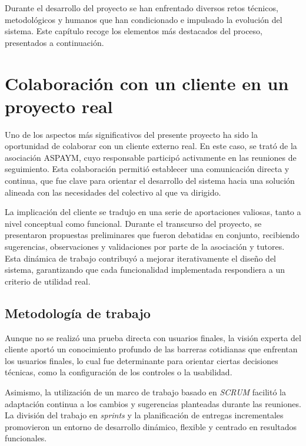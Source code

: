 Durante el desarrollo del proyecto se han enfrentado diversos retos técnicos, metodológicos y humanos que han condicionado e impulsado la evolución del sistema. Este capítulo recoge los elementos más destacados del proceso, presentados a continuación.

\section{Colaboración con un cliente en un proyecto real}

Uno de los aspectos más significativos del presente proyecto ha sido la oportunidad de colaborar con un cliente externo real. En este caso, se trató de la asociación ASPAYM, cuyo responsable participó activamente en las reuniones de seguimiento. Esta colaboración permitió establecer una comunicación directa y continua, que fue clave para orientar el desarrollo del sistema hacia una solución alineada con las necesidades del colectivo al que va dirigido.

La implicación del cliente se tradujo en una serie de aportaciones valiosas, tanto a nivel conceptual como funcional. Durante el transcurso del proyecto, se presentaron propuestas preliminares que fueron debatidas en conjunto, recibiendo sugerencias, observaciones y validaciones por parte de la asociación y tutores. Esta dinámica de trabajo contribuyó a mejorar iterativamente el diseño del sistema, garantizando que cada funcionalidad implementada respondiera a un criterio de utilidad real.

\subsection{Metodología de trabajo}

Aunque no se realizó una prueba directa con usuarios finales, la visión experta del cliente aportó un conocimiento profundo de las barreras cotidianas que enfrentan los usuarios finales, lo cual fue determinante para orientar ciertas decisiones técnicas, como la configuración de los controles o la usabilidad.

Asimismo, la utilización de un marco de trabajo basado en \textit{SCRUM} facilitó la adaptación continua a los cambios y sugerencias planteadas durante las reuniones. La división del trabajo en \textit{sprints} y la planificación de entregas incrementales promovieron un entorno de desarrollo dinámico, flexible y centrado en resultados funcionales.

